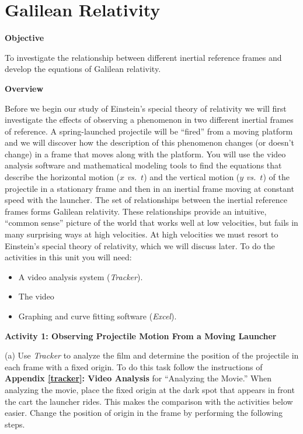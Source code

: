 
\section{Galilean Relativity}

\makelabheader %

\textbf{Objective }

To investigate the relationship between different inertial reference
frames and develop the equations of Galilean relativity.

\textbf{Overview}

Before we begin our study of Einstein's special theory of relativity
we will first investigate the effects of observing a phenomenon in
two different inertial frames of reference. A spring-launched projectile
will be ``fired'' from a moving platform and we will discover
how the description of this phenomenon changes (or doesn't change)
in a frame that moves along with the platform. You will use the video
analysis software and mathematical modeling tools to find the equations
that describe the horizontal motion ($x$ \textit{vs.}~$t$) and the vertical motion
($y$ \textit{vs.}~$t$) of the projectile in a stationary frame and then in an inertial
frame moving at constant speed with the launcher. The set of relationships
between the inertial reference frames forms Galilean relativity. These
relationships provide an intuitive, ``common sense'' picture of
the world that works well at low velocities, but fails in many surprising
ways at high velocities. At high velocities we must resort to Einstein's
special theory of relativity, which we will discuss later. To do the
activities in this unit you will need:

\begin{itemize}
\item A video analysis system (\emph{Tracker}).
\item The video 
\item Graphing and curve fitting software (\emph{Excel}).
\end{itemize}
\textbf{Activity 1: Observing Projectile Motion From a Moving Launcher}

(a) Use \emph{Tracker} to analyze the film  and determine the position of the projectile in each frame
with a fixed origin. To do this task follow the instructions of \textbf{Appendix
\ref{tracker}: Video Analysis} for ``Analyzing the Movie.''
When analyzing the movie, place the fixed origin at the dark spot that appears in front the cart the launcher rides.
This makes the comparison with the activities below easier. Change
the position of origin in the frame by performing the following steps.

